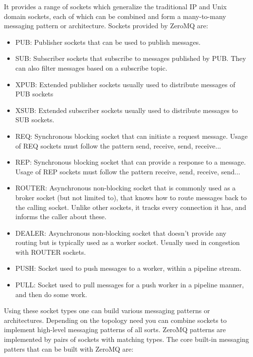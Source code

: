 \documentclass[12pt,a4paper]{report}
\begin{document}
		It provides a range of sockets which generalize the traditional IP and Unix domain sockets, each of which can be combined and form a many-to-many 
		messaging pattern or architecture. Sockets provided by ZeroMQ are:
				\begin{itemize}
					\item PUB: Publisher sockets that can be used to publish messages.
					\item SUB: Subscriber sockets that subscribe to messages published by PUB. They can also filter messages based on a subscribe topic.
					\item XPUB: Extended publisher sockets usually used to distribute messages of PUB sockets
					\item XSUB: Extended subscriber sockets usually used to distribute messages to SUB sockets.
					\item REQ: Synchronous blocking socket that can initiate a request message. Usage of REQ sockets must follow the pattern send, receive, 
								send, receive...
					\item REP: Synchronous blocking socket that can provide a response to a message.  Usage of REP sockets must follow the pattern receive, 
					send, receive, send...
					\item ROUTER: Asynchronous non-blocking socket that is commonly used as a broker socket (but not limited to), that knows how to route 
					messages back to the calling socket. Unlike other sockets, it tracks every connection it has, and informs the caller about these.
					\item DEALER: Asynchronous non-blocking socket that doesn't provide any routing but is typically used as a worker socket. Usually used in 
					congestion with ROUTER sockets.
					\item PUSH: Socket used to push messages to a worker, within a pipeline stream.
					\item PULL: Socket used to pull messages for a push worker in a pipeline manner, and then do some work.
				\end{itemize}
		Using these socket types one can build various messaging patterns or architectures. Depending on the topology need you can combine sockets to 
		implement high-level messaging patterns of all sorts. ZeroMQ patterns are implemented by pairs of sockets with matching types.
		The core built-in messaging patters that can be built with ZeroMQ are:
\end{document}
